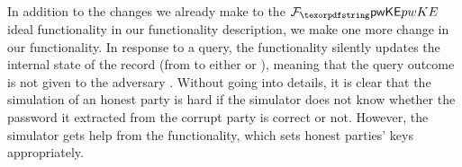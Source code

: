 In addition to the changes we already make to the $\FpwKE$ ideal functionality in our \FPAKE functionality description, we make one more change in our \iPAKE functionality.
In response to a \TestPwd query, the functionality silently updates the internal state of the record (from  to either  or  ), meaning that the query outcome is not given to the adversary \Sim.
Without going into details, it is clear that the simulation of an honest party is hard if the simulator \Sim does not know whether the password it extracted from the corrupt party is correct or not. 
However, the simulator gets help from the functionality, which sets honest parties' keys appropriately.


